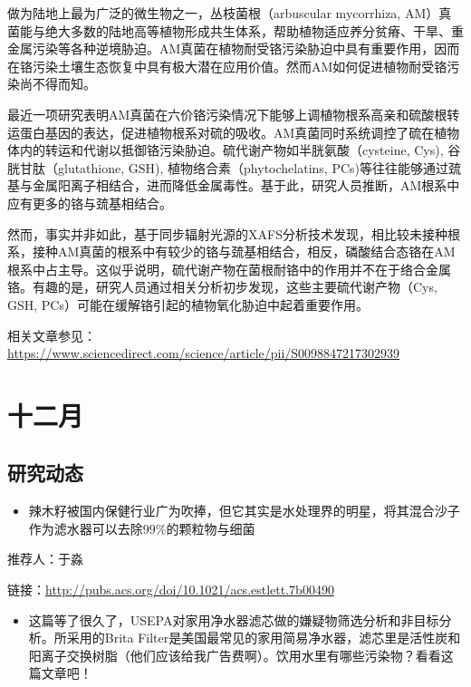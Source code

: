 \documentclass[]{book}
\providecommand{\tightlist}{%
  \setlength{\itemsep}{0pt}\setlength{\parskip}{0pt}}
\begin{document}
做为陆地上最为广泛的微生物之一，丛枝菌根（arbuscular mycorrhiza, AM）真菌能与绝大多数的陆地高等植物形成共生体系，帮助植物适应养分贫瘠、干旱、重金属污染等各种逆境胁迫。AM真菌在植物耐受铬污染胁迫中具有重要作用，因而在铬污染土壤生态恢复中具有极大潜在应用价值。然而AM如何促进植物耐受铬污染尚不得而知。

最近一项研究表明AM真菌在六价铬污染情况下能够上调植物根系高亲和硫酸根转运蛋白基因的表达，促进植物根系对硫的吸收。AM真菌同时系统调控了硫在植物体内的转运和代谢以抵御铬污染胁迫。硫代谢产物如半胱氨酸（cysteine, Cys), 谷胱甘肽（glutathione, GSH), 植物络合素（phytochelatins, PCs)等往往能够通过巯基与金属阳离子相结合，进而降低金属毒性。基于此，研究人员推断，AM根系中应有更多的铬与巯基相结合。

然而，事实并非如此，基于同步辐射光源的XAFS分析技术发现，相比较未接种根系，接种AM真菌的根系中有较少的铬与巯基相结合，相反，磷酸结合态铬在AM根系中占主导。这似乎说明，硫代谢产物在菌根耐铬中的作用并不在于络合金属铬。有趣的是，研究人员通过相关分析初步发现，这些主要硫代谢产物（Cys, GSH, PCs）可能在缓解铬引起的植物氧化胁迫中起着重要作用。

相关文章参见：\url{https://www.sciencedirect.com/science/article/pii/S0098847217302939}

\hypertarget{ux5341ux4e8cux6708}{%
\section*{十二月}\label{ux5341ux4e8cux6708}}

\hypertarget{ux7814ux7a76ux52a8ux6001-1}{%
\subsection*{研究动态}\label{ux7814ux7a76ux52a8ux6001-1}}

\begin{itemize}
\tightlist
\item
  辣木籽被国内保健行业广为吹捧，但它其实是水处理界的明星，将其混合沙子作为滤水器可以去除99\%的颗粒物与细菌
\end{itemize}

推荐人：于淼

链接：\url{http://pubs.acs.org/doi/10.1021/acs.estlett.7b00490}

\begin{itemize}
\tightlist
\item
  这篇等了很久了，USEPA对家用净水器滤芯做的嫌疑物筛选分析和非目标分析。所采用的Brita Filter是美国最常见的家用简易净水器，滤芯里是活性炭和阳离子交换树脂（他们应该给我广告费啊）。饮用水里有哪些污染物？看看这篇文章吧！
\end{itemize}
\end{document}
